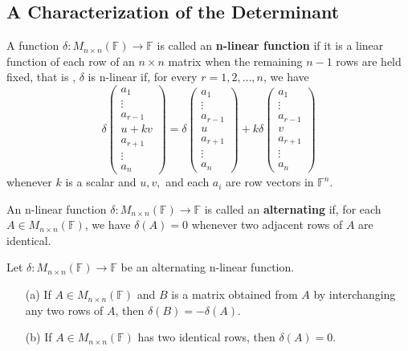 \subsection{A Characterization of the Determinant}
\begin{definition}
    A function \(\delta: M_{n \times n}(\mathbb{F}) \to \mathbb{F}\) is called an \textbf{n-linear function} if it is a linear function of each row of an \( n \times n \) matrix when the remaining \( n-1\) rows are held fixed, that is , \(\delta\) is n-linear if, for every \(r=1,2,\dots ,n\), we have
    \[
    \delta \begin{pmatrix} a_1 \\ \vdots \\ a_{r-1} \\ u + kv \\ a_{r+1} \\ \vdots \\ a_n \end{pmatrix}
    = \delta \begin{pmatrix} a_1 \\ \vdots \\ a_{r-1} \\ u \\ a_{r+1} \\ \vdots \\ a_n \end{pmatrix}
    + k \delta \begin{pmatrix} a_1 \\ \vdots \\ a_{r-1} \\ v \\ a_{r+1} \\ \vdots \\ a_n \end{pmatrix}
    \]
    whenever \(k\) is a scalar and \(u, v,\) and each \(a_i\) are row vectors in \(\mathbb{F}^n\).
\end{definition}
\begin{definition}
    An n-linear function \(\delta: M_{n \times n}(\mathbb{F}) \to \mathbb{F}\) is called an \textbf{alternating} if, for each \(A \in M_{n \times n}(\mathbb{F})\), we have \(\delta(A) = 0\) whenever two adjacent rows of \(A\) are identical.
\end{definition}
\begin{theorem}
    Let \(\delta: M_{n \times n}(\mathbb{F}) \to \mathbb{F}\) be an alternating n-linear function.
    \begin{enumerate}
        \item[(a)] If \(A \in M_{n \times n}(\mathbb{F})\) and \(B\) is a matrix obtained from \(A\) by interchanging any two rows of \(A\), then \(\delta(B) = - \delta(A)\).
        \item[(b)] If \(A \in M_{n \times n}(\mathbb{F})\) has two identical rows, then \(\delta(A) = 0 \). 
    \end{enumerate}
\end{theorem}
